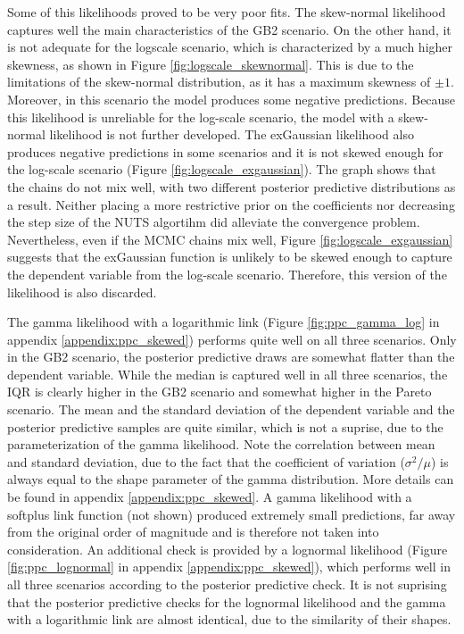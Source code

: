 Some of this likelihoods proved to be very poor fits.
The skew-normal likelihood captures well the main characteristics of the GB2 scenario.
On the other hand, it is not adequate for the logscale scenario, which is characterized by a much higher skewness, as shown in Figure \ref{fig:logscale_skewnormal}.
This is due to the limitations of the skew-normal distribution, as it has a maximum skewness of $\pm 1$.
Moreover, in this scenario the model produces some negative predictions.
Because this likelihood is unreliable for the log-scale scenario, the model with a skew-normal likelihood is not further developed.
The exGaussian likelihood also produces negative predictions in some scenarios and it is not skewed enough for the log-scale scenario (Figure \ref{fig:logscale_exgaussian}).
The graph shows that the chains do not mix well, with two different posterior predictive distributions as a result.
Neither placing a more restrictive prior on the coefficients nor decreasing the step size of the NUTS algortihm did alleviate the convergence problem.
Nevertheless, even if the MCMC chains mix well, Figure \ref{fig:logscale_exgaussian} suggests that the exGaussian function is unlikely to be skewed enough to capture the dependent variable from the log-scale scenario.
Therefore, this version of the likelihood is also discarded.

The gamma likelihood with a logarithmic link (Figure \ref{fig:ppc_gamma_log} in appendix \ref{appendix:ppc_skewed}) performs quite well on all three scenarios.
Only in the GB2 scenario, the posterior predictive draws are somewhat flatter than the dependent variable.
While the median is captured well in all three scenarios, the IQR is clearly higher in the GB2 scenario and somewhat higher in the Pareto scenario.
The mean and the standard deviation of the dependent variable and the posterior predictive samples are quite similar, which is not a suprise, due to the parameterization of the gamma likelihood.
Note the correlation between mean and standard deviation, due to the fact that the coefficient of variation ($\sigma^2/\mu $) is always equal to the shape parameter of the gamma distribution.
More details can be found in appendix \ref{appendix:ppc_skewed}.
A gamma likelihood with a softplus link function (not shown) produced extremely small predictions, far away from the original order of magnitude and is therefore not taken into consideration.
An additional check is provided by a lognormal likelihood (Figure \ref{fig:ppc_lognormal} in appendix \ref{appendix:ppc_skewed}), which performs well in all three scenarios according to the posterior predictive check.
It is not suprising that the posterior predictive checks for the lognormal likelihood and the gamma with a logarithmic link are almost identical, due to the similarity of their shapes.

